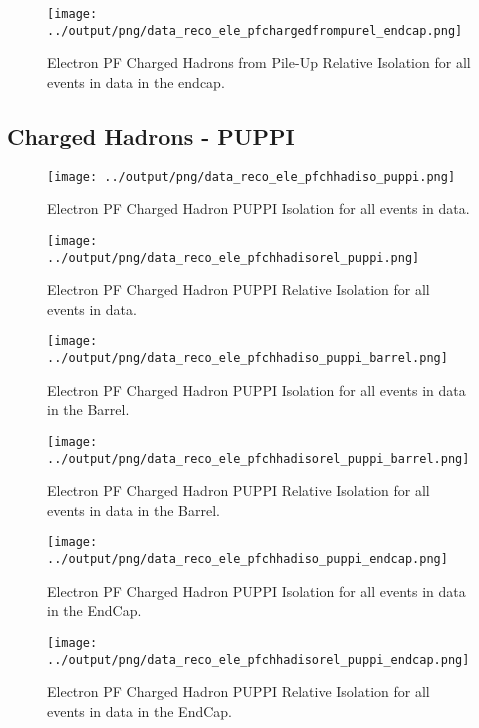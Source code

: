 \documentclass[11pt]{book}
\begin{document}
\begin{figure}[htb]
\centering
\texttt{[image: ../output/png/data\_reco\_ele\_pfchargedfrompurel\_endcap.png]}
\caption{Electron PF Charged Hadrons from Pile-Up Relative Isolation for all events in data in the endcap.}
\label{fig:data_ele_pfchargedfrompurel_endcap}
\end{figure}
\clearpage

\subsection{Charged Hadrons - PUPPI}
\begin{figure}[htb]
\centering
\texttt{[image: ../output/png/data\_reco\_ele\_pfchhadiso\_puppi.png]}
\caption{Electron PF Charged Hadron PUPPI Isolation for all events in data.}
\label{fig:data_ele_pfchhadiso_puppi}
\end{figure}

\begin{figure}[htb]
\centering
\texttt{[image: ../output/png/data\_reco\_ele\_pfchhadisorel\_puppi.png]}
\caption{Electron PF Charged Hadron PUPPI Relative Isolation for all events in data.}
\label{fig:data_ele_pfchhadisorel_puppi}
\end{figure}

\begin{figure}[htb]
\centering
\texttt{[image: ../output/png/data\_reco\_ele\_pfchhadiso\_puppi\_barrel.png]}
\caption{Electron PF Charged Hadron PUPPI Isolation for all events in data in the Barrel.}
\label{fig:data_ele_pfchhadiso_puppi_barrel}
\end{figure}

\begin{figure}[htb]
\centering
\texttt{[image: ../output/png/data\_reco\_ele\_pfchhadisorel\_puppi\_barrel.png]}
\caption{Electron PF Charged Hadron PUPPI Relative Isolation for all events in data in the Barrel.}
\label{fig:data_ele_pfchhadisorel_puppi_barrel}
\end{figure}

\begin{figure}[htb]
\centering
\texttt{[image: ../output/png/data\_reco\_ele\_pfchhadiso\_puppi\_endcap.png]}
\caption{Electron PF Charged Hadron PUPPI Isolation for all events in data in the EndCap.}
\label{fig:data_ele_pfchhadiso_puppi_endcap}
\end{figure}

\begin{figure}[htb]
\centering
\texttt{[image: ../output/png/data\_reco\_ele\_pfchhadisorel\_puppi\_endcap.png]}
\caption{Electron PF Charged Hadron PUPPI Relative Isolation for all events in data in the EndCap.}
\label{fig:data_ele_pfchhadisorel_puppi_endcap}
\end{figure}
\clearpage
\end{document}
